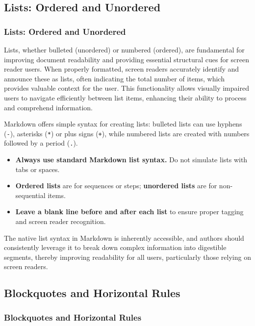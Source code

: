 \subsection{Lists: Ordered and Unordered}
\subsubsection{Lists: Ordered and Unordered}

Lists, whether bulleted (unordered) or numbered (ordered), are fundamental for improving document readability and providing essential structural cues for screen reader users. \cite{DSU,UNIWeb,GitLabDocs} When properly formatted, screen readers accurately identify and announce these as lists, often indicating the total number of items, which provides valuable context for the user. \cite{DSU} This functionality allows visually impaired users to navigate efficiently between list items, enhancing their ability to process and comprehend information.

Markdown offers simple syntax for creating lists: bulleted lists can use hyphens (\texttt{-}), asterisks (\texttt{*}) or plus signs (\texttt{+}), while numbered lists are created with numbers followed by a period (\texttt{.}). \cite{MarkdownGuideExtended}

\begin{itemize}
    \item \textbf{Always use standard Markdown list syntax.} Do not simulate lists with tabs or spaces.
    \item \textbf{Ordered lists} are for sequences or steps; \textbf{unordered lists} are for non-sequential items.
    \item \textbf{Leave a blank line before and after each list} to ensure proper tagging and screen reader recognition.
\end{itemize}

The native list syntax in Markdown is inherently accessible, and authors should consistently leverage it to break down complex information into digestible segments, thereby improving readability for all users, particularly those relying on screen readers.

\subsection{Blockquotes and Horizontal Rules}
\subsubsection{Blockquotes and Horizontal Rules}

